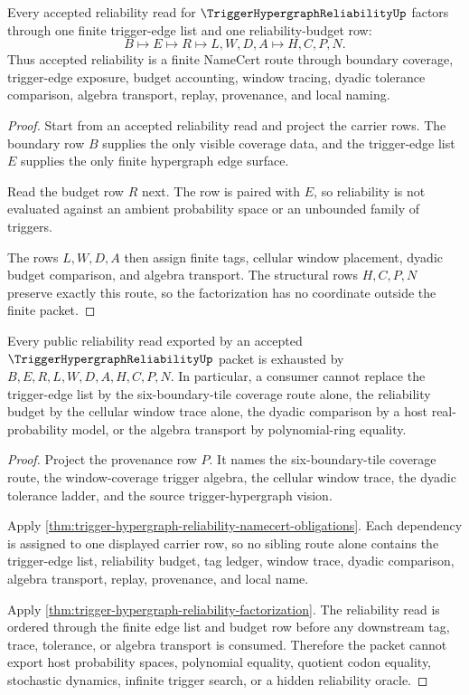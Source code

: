 \begin{theorem}
\label{thm:trigger-hypergraph-reliability-factorization}
Every accepted reliability read for $\TriggerHypergraphReliabilityUp$ factors through one finite trigger-edge list and one reliability-budget row:
$$
B\longmapsto E\longmapsto R\longmapsto L,W,D,A\longmapsto H,C,P,N .
$$
Thus accepted reliability is a finite NameCert route through boundary coverage, trigger-edge exposure, budget accounting, window tracing, dyadic tolerance comparison, algebra transport, replay, provenance, and local naming.
\end{theorem}
\begin{proof}
Start from an accepted reliability read and project the carrier rows. The boundary row $B$ supplies the only visible coverage data, and the trigger-edge list $E$ supplies the only finite hypergraph edge surface.

Read the budget row $R$ next. The row is paired with $E$, so reliability is not evaluated against an ambient probability space or an unbounded family of triggers.

The rows $L,W,D,A$ then assign finite tags, cellular window placement, dyadic budget comparison, and algebra transport. The structural rows $H,C,P,N$ preserve exactly this route, so the factorization has no coordinate outside the finite packet.
\end{proof}

\begin{theorem}
\label{thm:trigger-hypergraph-reliability-nonescape}
Every public reliability read exported by an accepted $\TriggerHypergraphReliabilityUp$ packet is exhausted by $B,E,R,L,W,D,A,H,C,P,N$. In particular, a consumer cannot replace the trigger-edge list by the six-boundary-tile coverage route alone, the reliability budget by the cellular window trace alone, the dyadic comparison by a host real-probability model, or the algebra transport by polynomial-ring equality.
\end{theorem}
\begin{proof}
Project the provenance row $P$. It names the six-boundary-tile coverage route, the window-coverage trigger algebra, the cellular window trace, the dyadic tolerance ladder, and the source trigger-hypergraph vision.

Apply \autoref{thm:trigger-hypergraph-reliability-namecert-obligations}. Each dependency is assigned to one displayed carrier row, so no sibling route alone contains the trigger-edge list, reliability budget, tag ledger, window trace, dyadic comparison, algebra transport, replay, provenance, and local name.

Apply \autoref{thm:trigger-hypergraph-reliability-factorization}. The reliability read is ordered through the finite edge list and budget row before any downstream tag, trace, tolerance, or algebra transport is consumed. Therefore the packet cannot export host probability spaces, polynomial equality, quotient codon equality, stochastic dynamics, infinite trigger search, or a hidden reliability oracle.
\end{proof}

